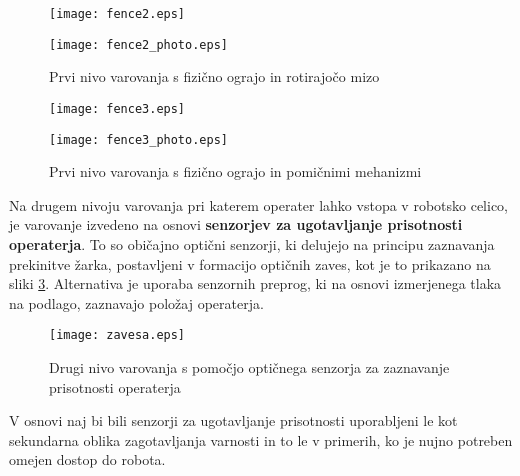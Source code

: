 \begin{figure}[h]
\begin{minipage}[c]{0.5\columnwidth}
\centering
\texttt{[image: fence2.eps]}
\end{minipage}
\begin{minipage}[c]{0.5\columnwidth}
\centering
\texttt{[image: fence2\_photo.eps]}
\end{minipage}
\caption{\label{level1b}Prvi nivo varovanja s fizično ograjo in
rotirajočo mizo}
\end{figure}

\begin{figure}[h]
\begin{minipage}[c]{0.5\columnwidth}
\centering
\texttt{[image: fence3.eps]}
\end{minipage}
\begin{minipage}[c]{0.5\columnwidth}
\centering
\texttt{[image: fence3\_photo.eps]}
\end{minipage}
\caption{\label{level1c}Prvi nivo varovanja s fizično ograjo in
pomičnimi mehanizmi}
\end{figure}


Na drugem nivoju varovanja pri katerem operater lahko vstopa v
robotsko celico, je varovanje izvedeno na osnovi \textbf{senzorjev
za ugotavljanje prisotnosti operaterja}. To so običajno optični
senzorji, ki delujejo na principu zaznavanja prekinitve žarka,
postavljeni v formacijo optičnih zaves, kot je to prikazano na sliki
\ref{zavesa}. Alternativa je uporaba senzornih preprog, ki na osnovi
izmerjenega tlaka na podlago, zaznavajo položaj operaterja.
\begin{figure}[h]
\centering
\texttt{[image: zavesa.eps]}
\caption{\label{zavesa}Drugi nivo varovanja s pomočjo optičnega
senzorja za zaznavanje prisotnosti operaterja}
\end{figure}

V osnovi naj bi bili senzorji za ugotavljanje prisotnosti
uporabljeni le kot sekundarna oblika zagotavljanja varnosti in to le
v primerih, ko je nujno potreben omejen dostop do robota.


